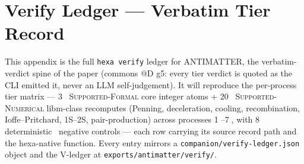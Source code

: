 \section{Verify Ledger --- Verbatim Tier Record}
\label{app:verify-ledger}

This appendix is the full \texttt{hexa verify} ledger for ANTIMATTER, the
verbatim-verdict spine of the paper (commons @D g5: every tier verdict is
quoted as the CLI emitted it, never an LLM self-judgement). It will reproduce
the per-process tier matrix --- 3 \tierBlue\ \textsc{Supported-Formal} core
integer atoms + 20 \tierGreen\ \textsc{Supported-Numerical} libm-class
recomputes (Penning, deceleration, cooling, recombination, Ioffe--Pritchard,
1S--2S, pair-production) across processes
\textcircled{\scriptsize 1}--\textcircled{\scriptsize 7}, with 8
deterministic \tierRed\ negative controls --- each row carrying its source
record path and the hexa-native function. Every entry mirrors a
\texttt{companion/verify-ledger.json} object and the V-ledger at
\texttt{exports/antimatter/verify/}.


